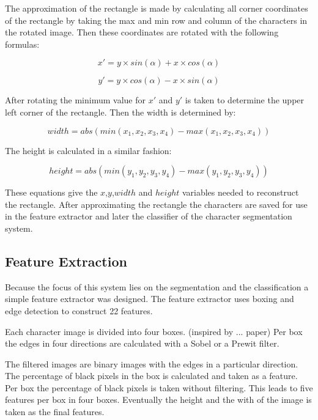 The approximation of the rectangle is made by calculating  all corner coordinates of the rectangle by taking the max and min row and column of the characters in the rotated image. Then these coordinates are rotated with the following formulas:

\begin{equation}
    x' = y \times sin(\alpha) + x \times cos(\alpha)
\end{equation}

\begin{equation}
    y' = y \times cos(\alpha) - x \times sin(\alpha)
\end{equation}

After rotating the minimum value for $x'$ and $y'$ is taken to determine the upper left corner of the rectangle. Then the width is determined by:

\begin{equation}
    width = abs(min(x_1,x_2,x_3,x_4) - max(x_1,x_2,x_3,x_4))
\end{equation}

The height is calculated in a similar fashion:

\begin{equation}
    height = abs(min(y_1,y_2,y_3,y_4) - max(y_1,y_2,y_3,y_4))
\end{equation}

These equations give the $x$,$y$,$width$ and $height$ variables needed to reconstruct the rectangle. After approximating the rectangle the characters are saved for use in the feature extractor and later the classifier of the character segmentation system.

\subsection{Feature Extraction}


Because the focus of this system lies on the segmentation and the classification a simple feature extractor was designed. The feature extractor uses boxing and edge detection to construct 22 features.

Each character image is divided into four boxes. (inspired by ... paper) Per box the edges in four directions are calculated with a Sobel or a Prewit filter.



The filtered images are binary images with the edges in a particular direction. The percentage of black pixels in the box is calculated and taken as a feature. Per box the percentage of black pixels is taken without filtering. This leads to five features per box in four boxes. Eventually the height and the with of the image is taken as the final features.

